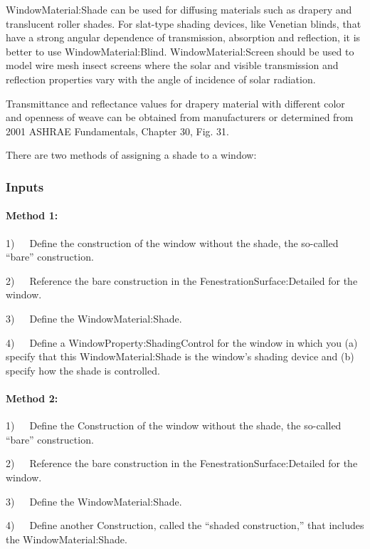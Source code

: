 WindowMaterial:Shade can be used for diffusing materials such as drapery and translucent roller shades. For slat-type shading devices, like Venetian blinds, that have a strong angular dependence of transmission, absorption and reflection, it is better to use WindowMaterial:Blind. WindowMaterial:Screen should be used to model wire mesh insect screens where the solar and visible transmission and reflection properties vary with the angle of incidence of solar radiation.

Transmittance and reflectance values for drapery material with different color and openness of weave can be obtained from manufacturers or determined from 2001 ASHRAE Fundamentals, Chapter 30, Fig. 31.

There are two methods of assigning a shade to a window:

\subsubsection{Inputs}\label{inputs-22-005}

\paragraph{Method 1:}\label{method-1}

1)~~~Define the construction of the window without the shade, the so-called ``bare'' construction.

2)~~~Reference the bare construction in the FenestrationSurface:Detailed for the window.

3)~~~Define the WindowMaterial:Shade.

4)~~~Define a WindowProperty:ShadingControl for the window in which you (a) specify that this WindowMaterial:Shade is the window's shading device and (b) specify how the shade is controlled.

\paragraph{Method 2:}\label{method-2}

1)~~~Define the Construction of the window without the shade, the so-called ``bare'' construction.

2)~~~Reference the bare construction in the FenestrationSurface:Detailed for the window.

3)~~~Define the WindowMaterial:Shade.

4)~~~Define another Construction, called the ``shaded construction,'' that includes the WindowMaterial:Shade.

